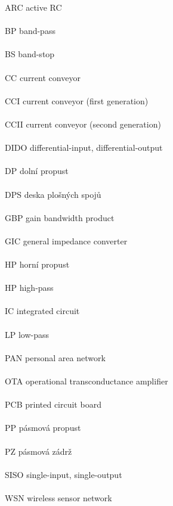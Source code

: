 ARC \hfill active RC \\ \\
BP \hfill band-pass \\ \\
BS \hfill band-stop \\ \\
CC \hfill current conveyor \\ \\
CCI \hfill current conveyor (first generation) \\ \\
CCII \hfill current conveyor (second generation) \\ \\
DIDO \hfill differential-input, differential-output \\ \\
DP \hfill dolní propust \\ \\
DPS \hfill deska plošných spojů \\ \\
GBP \hfill gain bandwidth product \\ \\
GIC \hfill general impedance converter \\ \\
HP \hfill horní propust \\ \\
HP \hfill high-pass \\ \\
IC \hfill integrated circuit \\ \\
LP \hfill low-pass \\ \\
PAN \hfill personal area network \\ \\
OTA \hfill operational transconductance amplifier \\ \\
PCB \hfill printed circuit board \\ \\
PP \hfill pásmová propust \\ \\
PZ \hfill pásmová zádrž \\ \\
SISO \hfill single-input, single-output \\ \\
WSN \hfill wireless sensor network \\ \\
